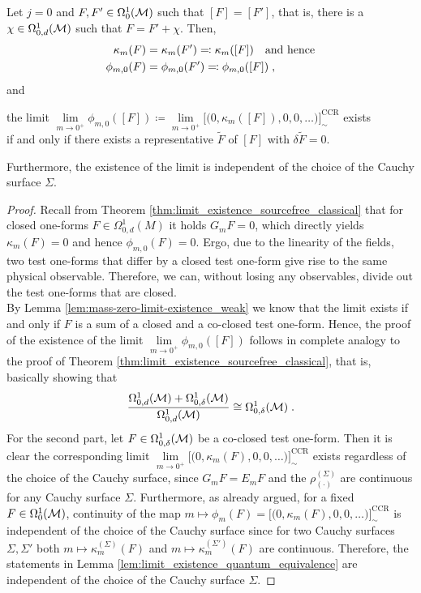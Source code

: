\begin{theorem}\label{thm:limit_existence_sourcefree}
Let $j=0$ and $F, F' \in \Omega^1_0(\mathcal{M})$ such that $[F] = [F']$, that is, there is a $\chi \in \Omega^1_{0,d}(\mathcal{M})$ such that $F = F' + \chi$.  Then,
	\begin{align*}
	\kappa_m(F) &= \kappa_m (F') \eqqcolon \kappa_m ([F]) \quad\text{and hence}\\
	\phi_{m,0}(F) &= \phi_{m,0}(F') \eqqcolon \phi_{m,0}([F]) \;,
	\end{align*}
and
\begin{center}
	the limit $\lim\limits_{m \to 0^+}  \phi_{m,0}([F]) \coloneqq \lim\limits_{m \to 0^+} \big[\big( 0 , \kappa_m([F]) , 0 , 0, \dots\big)\big]^\text{CCR}_\sim $ exists\\[2mm]  if and only if there exists a representative $\tilde{F}$ of $[F]$ with ${\delta{\tilde{F}}} = 0 $.
\end{center}
Furthermore, the existence of the limit is independent of the choice of the Cauchy surface $\Sigma$.
\end{theorem}
\begin{proof}
	Recall from Theorem \ref{thm:limit_existence_sourcefree_classical} that for closed one-forms $F \in \Omega^1_{0,d}(M)$ it holds $G_m F = 0$, which directly yields $\kappa_m(F) = 0$ and hence $\phi_{m,0}(F) = 0$. Ergo, due to the linearity of the fields, two test one-forms that differ by a closed test one-form give rise to the same physical observable.
	Therefore, we can, without losing any observables, divide out the test one-forms that are closed. \\
	By Lemma \ref{lem:mass-zero-limit-existence_weak}  we know that the limit exists if and only if $F$ is a sum of a closed and a co-closed test one-form.
	Hence, the proof of the existence of the limit $\lim\limits_{m \to 0^+}  \phi_{m,0}([F])$ follows in complete analogy to the proof of Theorem \ref{thm:limit_existence_sourcefree_classical}, that is, basically showing that 	\begin{align}
	\frac{\Omega^1_{0,d}(\mathcal{M}) + \Omega^1_{0,\delta}(\mathcal{M})}{\Omega^1_{0,d}(\mathcal{M})} \cong \Omega^1_{0,\delta}(\mathcal{M}) \;.
	\end{align}
For the second part, let $F \in \Omega^1_{0,\delta}(\mathcal{M})$ be a co-closed test one-form. Then it is clear the corresponding limit $\lim\limits_{m \to 0^+} \big[\big( 0 , \kappa_m(F) , 0 , 0, \dots\big)\big]^\text{CCR}_\sim $ exists regardless of the choice of the Cauchy surface, since $G_m F = E_m F$ and the $\rho^{(\Sigma)}_{(\cdot)}$ are continuous for any Cauchy surface $\Sigma$. Furthermore, as already argued, for a fixed $F \in \Omega^1_0(\mathcal{M})$, continuity of the map $m \mapsto \phi_m(F) = \big[\big( 0 , \kappa_m(F) , 0 , 0, \dots\big)\big]^\text{CCR}_\sim$ is independent of the choice of the Cauchy surface since for two Cauchy surfaces $\Sigma, \Sigma'$ both $m \mapsto \kappa_m^{(\Sigma)}(F)$ and $m \mapsto \kappa_m^{(\Sigma')}(F)$ are continuous. Therefore, the statements in Lemma \ref{lem:limit_existence_quantum_equivalence} are independent of the choice of the Cauchy surface $\Sigma$.
\end{proof}
